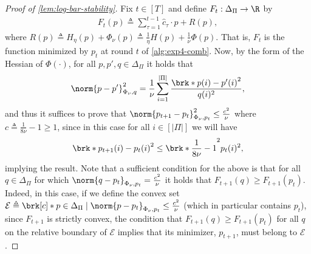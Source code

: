 \documentclass[11pt]{article}
\newcommand{\eqdef}{\triangleq}
\newcommand{\liad}[1]{\textcolor{blue}{\bf \{LE: #1\}}}
\newcommand{\calW}{\mathcal{W}}
\newcommand{\calE}{\mathcal{E}}
\theoremstyle{plain}
\newtheorem{lemma}{Lemma}
\begin{document}


\begin{proof}[Proof of \cref{lem:log-bar-stability}]
    Fix $t \in [T]$ and define $F_t : \Delta_\Pi \to \R$ by
    \begin{align*}
        F_t(p) \eqdef \sum_{\tau=1}^{t-1} \hat c_\tau \cdot p + R(p),
    \end{align*}
    where $R(p)\eqdef H_\eta(p) + \Phi_\nu(p) \eqdef \frac{1}{\eta} H(p) + \frac{1}{\nu} \Phi(p) $. That is, $F_t$ is the function minimized by $p_t$ at round $t$ of \cref{alg:exp4-comb}. Now, by the form of the Hessian of $\Phi(\cdot)$, for all $p,p',q \in \Delta_\Pi$ it holds that
    \begin{align*}
        \norm{p - p'}^2_{\Phi_\nu,q} = \frac{1}{\nu} \sum_{i=1}^{|\Pi|} \frac{\brk*{p(i) - p'(i)}^2}{q(i)^2},
    \end{align*}
    and thus it suffices to prove that $\norm{p_{t+1} - p_t}^2_{\Phi_\nu,p_t} \leq \frac{c^2}{\nu}$ where $c \eqdef \frac{1}{8\nu} - 1 \geq 1$, since in this case for all $i \in [|\Pi|]$ we will have
    \begin{align*}
        \brk*{p_{t+1}(i) - p_t(i)}^2 \leq \brk*{\frac{1}{8 \nu} - 1}^2 p_t(i)^2,
    \end{align*}
    implying the result. 
    Note that a sufficient condition for the above is that for all $q \in \Delta_\Pi$ for which $\norm{q-p_t}_{\Phi_\nu,p_t} = \frac{c^2}{\nu}$ it holds that $F_{t+1}(q) \geq F_{t+1}(p_t)$. Indeed, in this case, if we define the convex set $\calE \eqdef \brk[c]*{p \in \Delta_\Pi \mid \norm{p-p_t}_{\Phi_\nu,p_t} \leq \frac{c^2}{\nu}}$ (which in particular contains $p_t$), since $F_{t+1}$ is strictly convex, the condition that $F_{t+1}(q) \geq F_{t+1}(p_t)$ for all $q$ on the relative boundary of $\calE$ implies that its minimizer, $p_{t+1}$, must belong to $\calE$.

\end{proof}
\end{document}
